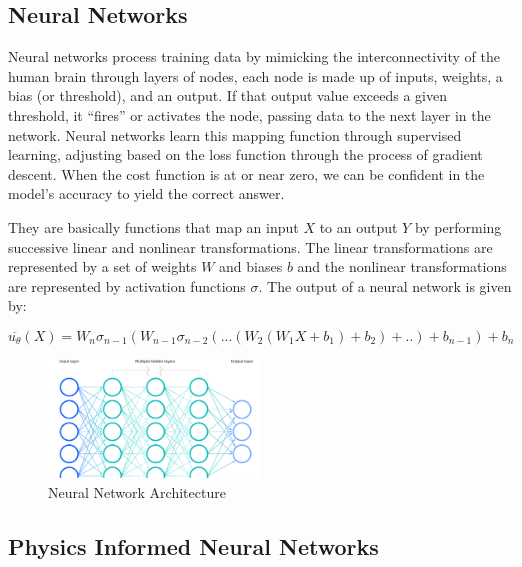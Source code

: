 \documentclass{article}
\begin{document}
\subsection{Neural Networks}

Neural networks process training data by mimicking the interconnectivity of the human brain through layers of nodes, each node is made up of inputs, weights, a bias (or threshold), and an output. If that output value exceeds a given threshold, it “fires” or activates the node, passing data to the next layer in the network. Neural networks learn this mapping function through supervised learning,
adjusting based on the loss function through the process of gradient descent. When the cost function is at or near zero, we can be confident in the model’s accuracy to yield the correct answer.

They are basically functions that map an input $X$ to an output $Y$ by performing successive linear and nonlinear transformations. The linear transformations are represented by a set of weights $W$ and biases $b$ and the nonlinear transformations are represented by activation functions $\sigma$. The output of a neural network is given by:

$$\overline{u_\theta}(X)=W_n\sigma_{n-1}(W_{n-1}\sigma_{n-2}(...(W_2(W_1X+b_1)+b_2)+..)+b_{n-1})+b_n$$

\begin{figure}[H]
    \centering
    \includegraphics[width=0.5\textwidth]{images/neural_network.png}
    \caption{Neural Network Architecture}
\end{figure}
\subsection{Physics Informed Neural Networks}
\end{document}
